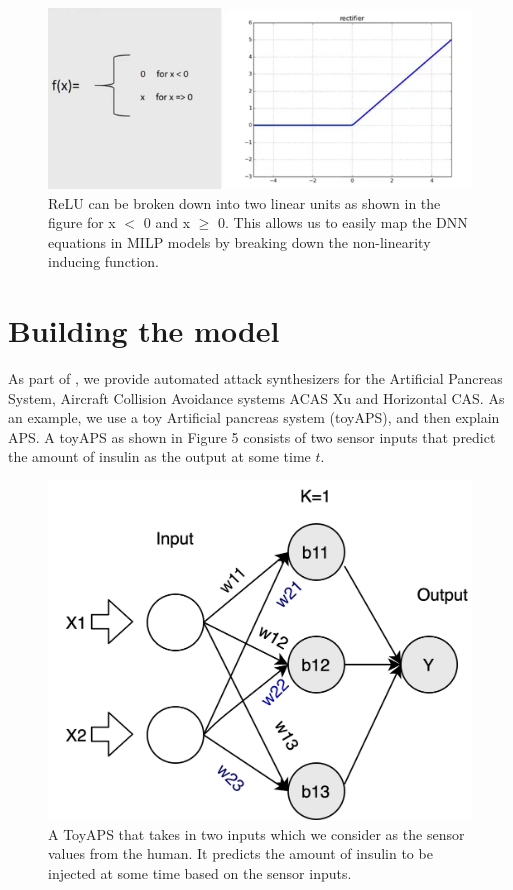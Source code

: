 \begin{figure}
	\centering
	\includegraphics[width=0.7\linewidth]{Images/ReLUbreakdown}
	\caption{ReLU can be broken down into two linear units as shown in the figure for x $<$ 0 and x $\geq$ 0. This allows us to easily map the DNN equations in MILP models by breaking down the non-linearity inducing function.}
	\label{fig:relubreakdown}
\end{figure}

\section{Building the model}
\label{section:attacks}
As part of \tool, we provide automated attack synthesizers for the Artificial Pancreas System, Aircraft Collision Avoidance systems ACAS Xu and Horizontal CAS. %
As an example, we use a toy Artificial pancreas system (toyAPS),  and then explain APS. A toyAPS as shown in Figure 5  consists of two sensor inputs that predict the amount of insulin as the output at some time $t$. 
\begin{figure}
	\centering
	\includegraphics[width=0.7\linewidth]{Images/ToyAPS}
	\caption[A ToyAPS]{A ToyAPS that takes in two inputs which we consider as the sensor values from the human. It predicts the amount of insulin to be injected at some time based on the sensor inputs.}
	\label{fig:toyaps}
\end{figure}


